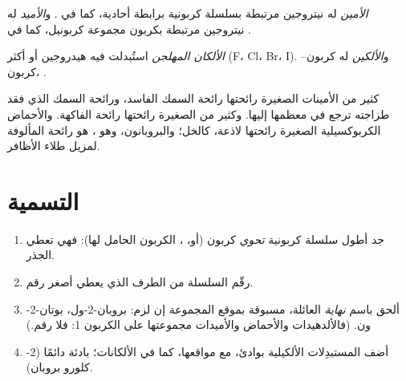 \begin{definition}\label{def:g11:functional-groups:amine}
\emph{الأمين} له  نيتروجين مرتبطة بسلسلة كربونية
برابطة أحادية، كما في . و\emph{الأميد} له  نيتروجين
مرتبطة بكربون مجموعة كربونيل، كما في .
\end{definition}

\begin{definition}\label{def:g11:functional-groups:halogenoalkane}
\emph{الألكان المهلجن}  استُبدلت فيه  هيدروجين
أو أكثر   (F، Cl، Br، I). و\emph{الألكين} له  كربون--كربون، .
\end{definition}

\begin{remark}\label{rem:g11:functional-groups:smells}
كثير من الأمينات الصغيرة رائحتها رائحة السمك الفاسد، ورائحة السمك الذي فقد طزاجته
ترجع في معظمها إليها. وكثير من  الصغيرة رائحتها رائحة الفاكهة. والأحماض
الكربوكسيلية الصغيرة رائحتها لاذعة، كالخل؛ والبروبانون، وهو ، هو رائحة
 المألوفة لمزيل طلاء الأظافر.
\end{remark}

\section{التسمية}

\begin{method}\label{met:g11:functional-groups:naming}
\begin{enumerate}
  \item جد أطول سلسلة كربونية \emph{تحوي} كربون
         (أو،  ، الكربون
        الحامل لها): فهي تعطي الجذر.
  \item رقّم السلسلة من الطرف الذي يعطي 
        أصغر رقم.
  \item ألحق باسم  \emph{نهاية} العائلة،
        مسبوقة بموقع المجموعة إن لزم: بروبان-2-ول،
        بوتان-2-ون. (فالألدهيدات والأحماض والأميدات مجموعتها على
        الكربون 1: فلا رقم.)
  \item أضف المستبدِلات الألكيلية بوادئ، مع مواقعها،
        كما في الألكانات؛  بادئة دائمًا (2-كلورو بروبان).
\end{enumerate}
\end{method}

